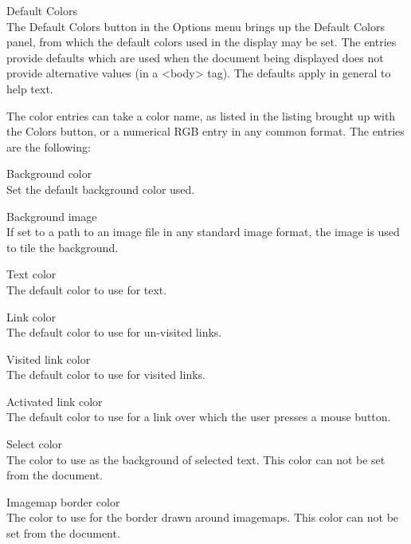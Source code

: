 \begin{description}
\item{\cb Default Colors}\\
The {\cb Default Colors} button in the {\cb Options} menu brings up
the {\cb Default Colors} panel, from which the default colors used in
the display may be set.  The entries provide defaults which are used
when the document being displayed does not provide alternative values
(in a {\vt <body>} tag).  The defaults apply in general to help text.

The color entries can take a color name, as listed in the listing
brought up with the {\cb Colors} button, or a numerical RGB entry in
any common format.  The entries are the following:

\begin{description}
\item{\cb Background color}\\
Set the default background color used.

\item{\cb Background image}\\
If set to a path to an image file in any standard image format, the
image is used to tile the background.

\item{\cb Text color}\\
The default color to use for text.

\item{\cb Link color}\\
The default color to use for un-visited links.

\item{\cb Visited link color}\\
The default color to use for visited links.

\item{\cb Activated link color}\\
The default color to use for a link over which the user presses a
mouse button.

\item{\cb Select color}\\
The color to use as the background of selected text.  This color can
not be set from the document.

\item{\cb Imagemap border color}\\
The color to use for the border drawn around imagemaps.  This color
can not be set from the document.
\end{description}


\end{description}

